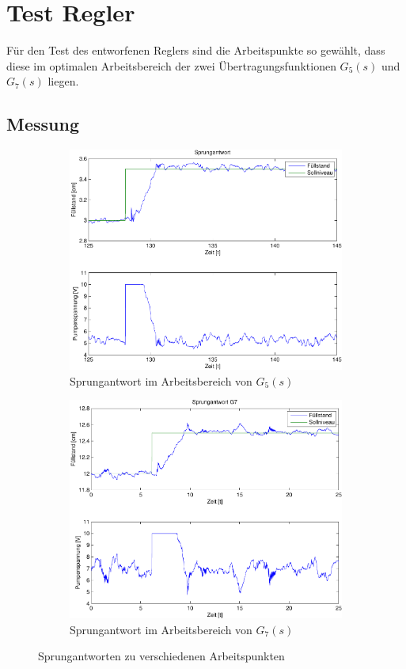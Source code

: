 \section{Test Regler}
Für den Test des entworfenen Reglers sind die Arbeitspunkte so gewählt, dass
diese im optimalen Arbeitsbereich der zwei Übertragungsfunktionen $G_5(s)$
und $G_7(s)$ liegen.

\subsection{Messung}
\begin{figure}[h!]
	\centering
	\begin{subfigure}{0.475\textwidth}
		\includegraphics[width=1\textwidth]{12/step_g5.pdf}
		\caption{Sprungantwort im Arbeitsbereich von $G_5(s)$}
	\end{subfigure}
	\hfill{}
	\begin{subfigure}{0.475\textwidth}
		\includegraphics[width=1\textwidth]{12/step_g7.pdf}
		\caption{Sprungantwort im Arbeitsbereich von $G_7(s)$}
	\end{subfigure}
	\caption{Sprungantworten zu verschiedenen Arbeitspunkten}
\end{figure}


